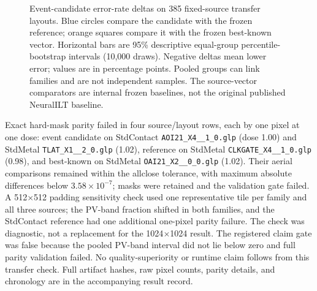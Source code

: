 \documentclass[conference]{IEEEtran}
\begin{document}
\begin{figure}[t]
\caption{Event-candidate error-rate deltas on 385 fixed-source transfer layouts. Blue circles compare the candidate with the frozen reference; orange squares compare it with the frozen best-known vector. Horizontal bars are 95\% descriptive equal-group percentile-bootstrap intervals (10,000 draws). Negative deltas mean lower error; values are in percentage points. Pooled groups can link families and are not independent samples. The source-vector comparators are internal frozen baselines, not the original published NeuralILT baseline.}
\label{fig:transfer-deltas}
\end{figure}

Exact hard-mask parity failed in four source/layout rows, each by one pixel at one dose: event candidate on StdContact \texttt{AOI21\_X4\_\_1\_0.glp} (dose 1.00) and StdMetal \texttt{TLAT\_X1\_\_2\_0.glp} (1.02), reference on StdMetal \texttt{CLKGATE\_X4\_\_1\_0.glp} (0.98), and best-known on StdMetal \texttt{OAI21\_X2\_\_0\_0.glp} (1.02). Their aerial comparisons remained within the allclose tolerance, with maximum absolute differences below $3.58\times10^{-7}$; masks were retained and the validation gate failed. A 512$\times$512 padding sensitivity check used one representative tile per family and all three sources; the PV-band fraction shifted in both families, and the StdContact reference had one additional one-pixel parity failure. The check was diagnostic, not a replacement for the 1024$\times$1024 result. The registered claim gate was false because the pooled PV-band interval did not lie below zero and full parity validation failed. No quality-superiority or runtime claim follows from this transfer check. Full artifact hashes, raw pixel counts, parity details, and chronology are in the accompanying result record.
\end{document}
